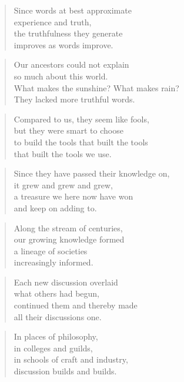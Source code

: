\documentclass[10pt,a4paper]{article}
\begin{document}
\begin{paracol}{2}
\begin{verse}
Since words at best approximate\\
experience and truth,\\
the truthfulness they generate\\
improves as words improve.
\end{verse}

\begin{verse}
Our ancestors could not explain\\
so much about this world.\\
What makes the sunshine? What makes rain?\\
They lacked more truthful words.
\end{verse}

\begin{verse}
Compared to us, they seem like fools,\\
but they were smart to choose\\
to build the tools that built the tools\\
that built the tools we use.
\end{verse}

\begin{verse}
Since they have passed their knowledge on,\\
it grew and grew and grew,\\
a treasure we here now have won\\
and keep on adding to.
\end{verse}

\begin{verse}
Along the stream of centuries,\\
our growing knowledge formed\\
a lineage of societies\\
increasingly informed.
\end{verse}

\begin{verse}
Each new discussion overlaid\\
what others had begun,\\
continued them and thereby made\\
all their discussions one.
\end{verse}

\begin{verse}
In places of philosophy,\\
in colleges and guilds,\\
in schools of craft and industry,\\
discussion builds and builds.
\end{verse}


\end{paracol}
\end{document}
